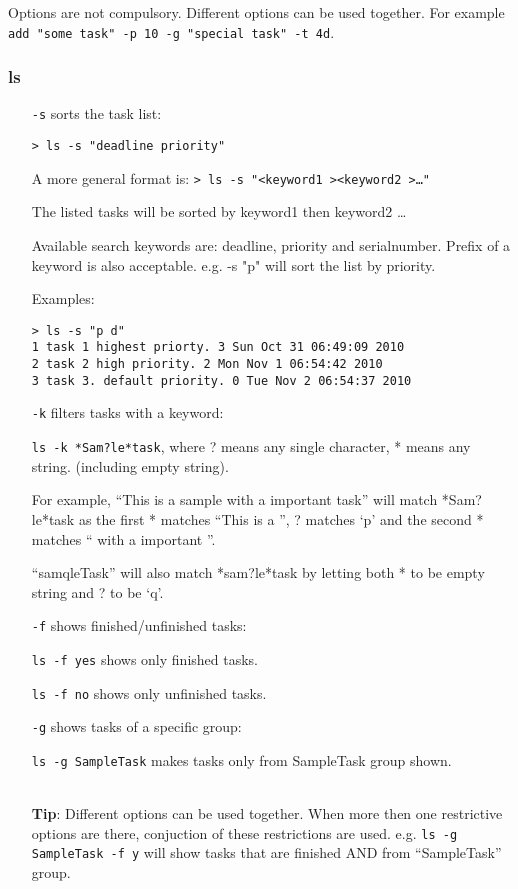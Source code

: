 \documentclass[12pt, a4paper]{article}
\begin{document}
Options are not compulsory. Different options can be used together. For example \texttt{add "some task" -p 10 -g "special task" -t 4d}.

\subsubsection{ls}

\begin{enumerate}
\item[ \texttt{-s} ] sorts the task list:

\texttt{\textgreater \ ls -s "deadline priority"}

A more general format is:
\texttt{\textgreater \ ls -s "\textless keyword1 \textgreater \textless keyword2 \textgreater \ldots"}

The listed tasks will be sorted by keyword1 then keyword2 \ldots
    
Available search keywords are: deadline, priority and serialnumber. Prefix of a keyword is also acceptable. e.g. \textgreaterls -s "p" will sort the list by priority.

Examples:

\texttt{\textgreater \ ls -s "p d"\\
  1   task 1 highest priorty.   3  Sun Oct 31 06:49:09 2010\\
  2   task 2 high priority.       2  Mon Nov  1 06:54:42 2010\\
  3   task 3. default priority.           0   Tue Nov  2 06:54:37 2010}

\item [ \texttt{-k} ] filters tasks with a keyword\footnotemark:

\texttt{ls -k *Sam?le*task}, where ? means any single character, * means any string. (including empty string).

For example, ``This is a sample with a important task'' will match *Sam?le*task as the first * matches ``This is a '', ? matches `p' and the second * matches `` with a important ''.

``samqleTask'' will also match *sam?le*task by letting both * to be empty string and ? to be `q'.

\item[ \texttt{-f} ] shows finished/unfinished tasks:

\texttt{ls -f yes} shows only finished tasks.

\texttt{ls -f no} shows only unfinished tasks.

\item[ \texttt{-g} ] shows tasks of a specific group:

\texttt{ls -g SampleTask} makes tasks only from SampleTask group shown.

\\ {\bf Tip}: Different options can be used together.
When more then one restrictive options are there, conjuction of these restrictions are used.
e.g. \texttt{ls -g SampleTask -f y} will show tasks that are finished AND from ``SampleTask'' group. 
\end{enumerate}
\end{document}
